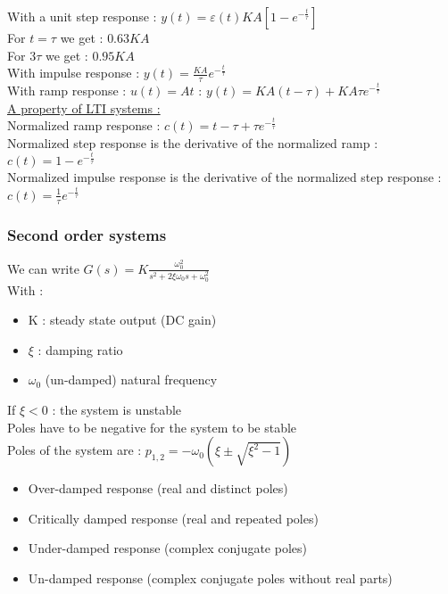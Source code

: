 \documentclass[../main.tex]{subfiles}
\begin{document}
With a unit step response : $y(t) = \varepsilon(t) KA [1-e^{-\frac{t}{\tau}}]$\\

For $t=\tau$ we get : $0.63KA$\\
For $3\tau$ we get : $0.95KA$\\

With impulse response : $y(t) = \frac{KA}{\tau} e^{-\frac{t}{\tau}}$\\

With ramp response : $u(t) = At$ : $y(t) = KA(t-\tau)+KA\tau e^{-\frac{t}{\tau}}$\\

\quad \underline{A property of LTI systems :}\\
Normalized ramp response : $c(t) = t-\tau + \tau e^{-\frac{t}{\tau}}$\\
Normalized step response is the derivative of the normalized ramp : $c(t) = 1-e^{-\frac{t}{\tau}}$\\
Normalized impulse response is the derivative of the normalized step response : $c(t) = \frac{1}{\tau} e^{-\frac{t}{\tau}}$\\

\subsubsection{Second order systems}
We can write $G(s) = K\frac{\omega_0^2}{s^2+2\xi \omega_0 s+\omega_0^2}$\\
With : \begin{itemize}
    \item K : steady state output (DC gain)\\
    \item $\xi$ : damping ratio\\
    \item $\omega_0$ (un-damped) natural frequency\\
\end{itemize}

If $\xi<0$ : the system is unstable\\
Poles have to be negative for the system to be stable\\
        
Poles of the system are : $p_{1,2} = -\omega_0(\xi \pm \sqrt{\xi^2-1})$\\

\begin{itemize}
    \item Over-damped response (real and distinct poles)\\
    \item Critically damped response (real and repeated poles)\\
    \item Under-damped response (complex conjugate poles)\\
    \item Un-damped response (complex conjugate poles without real parts)\\
\end{itemize}
\end{document}
